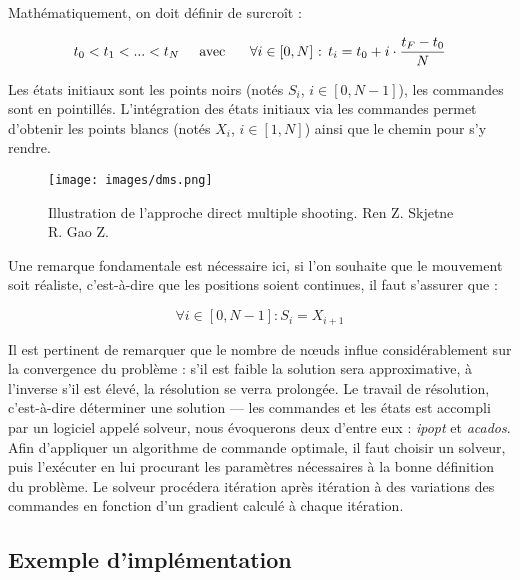 Mathématiquement, on doit définir de surcroît :

\begin{description}
\setlength\itemsep{-0.5em}
\item[Discrétisation du temps :] \[t_{0} < t_{1} < ... < t_{N} \text{\tab avec \tab } \forall i \in [0, N] \text{  :  } t_{i} = t_{0} + i \cdot \frac{t_{F}-t_{0}}{N} \]
\end{description}

Les états initiaux sont les points noirs (notés $S_{i}$, $i \in [0, N-1]$), les commandes sont en pointillés. L'intégration des états initiaux via les commandes permet d'obtenir les points blancs (notés $X_{i}$, $i \in [1, N]$) ainsi que le chemin pour s'y rendre.

\label{dms}
\begin{figure}[H]
\begin{center}
\texttt{[image: images/dms.png]}
\caption{Illustration de l'approche direct multiple shooting. Ren Z. Skjetne R. Gao Z. \cite{dms}}
\label{fig:dms}
\end{center}
\end{figure}

Une remarque fondamentale est nécessaire ici, si l'on souhaite que le mouvement soit réaliste, c'est-à-dire que les positions soient continues, il faut s'assurer que :
\begin{description}
\setlength\itemsep{-0.5em}
\item[Contrainte de continuité :] \[\forall i \in [0, N-1] : S_{i} = X_{i+1} \]
\end{description}

Il est pertinent de remarquer que le nombre de nœuds influe considérablement sur la convergence du problème : s'il est faible la solution sera approximative, à l'inverse s'il est élevé, la résolution se verra prolongée.
Le travail de résolution, c'est-à-dire déterminer une solution --- les commandes et les états est accompli par un logiciel appelé solveur, nous évoquerons deux d'entre eux : \emph{\gls{ipopt}} et \emph{\gls{acados}}. Afin d'appliquer un algorithme de commande optimale, il faut choisir un solveur, puis l’exécuter en lui procurant les paramètres nécessaires à la bonne définition du problème. Le solveur procédera itération après itération à des variations des commandes en fonction d'un gradient calculé à chaque itération.
        
            \subsection{Exemple d'implémentation}


